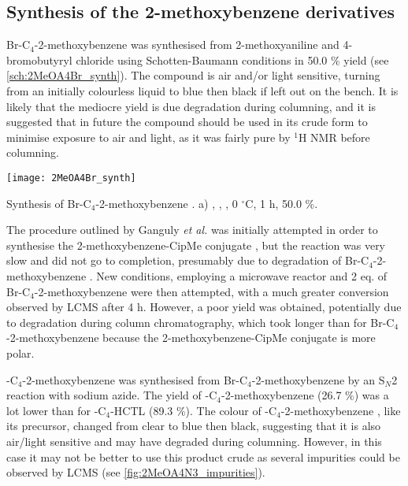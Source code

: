 
\subsection{Synthesis of the 2-methoxybenzene derivatives}

Br-C$_4$-2-methoxybenzene  was synthesised from 2-methoxyaniline  and 4-bromobutyryl chloride  using Schotten-Baumann conditions in 50.0 \% yield (see \ref{sch:2MeOA4Br_synth}). The compound is air and/or light sensitive, turning from an initially colourless liquid to blue then black if left out on the bench. It is likely that the mediocre yield is due degradation during columning, and it is suggested that in future the compound should be used in its crude form to minimise exposure to air and light, as it was fairly pure by $^{1}$H NMR before columning.

\begin{scheme}[H]
	\begin{center}
		\texttt{[image: 2MeOA4Br\_synth]}
		\caption{Synthesis of Br-C$_4$-2-methoxybenzene .
		a) , , , 0 $^{\circ}$C, 1 h, 50.0 \%.
		\label{sch:2MeOA4Br_synth}}
	\end{center}
\end{scheme}

The procedure outlined by Ganguly \textit{et al.}\cite{Ganguly2011} was initially attempted in order to synthesise the 2-methoxybenzene-CipMe conjugate , but the reaction was very slow and did not go to completion, presumably due to degradation of Br-C$_4$-2-methoxybenzene .
New conditions, employing a microwave reactor and 2 eq. of Br-C$_4$-2-methoxybenzene  were then attempted, with a much greater conversion observed by LCMS after 4 h. However, a poor yield was obtained, potentially due to degradation during column chromatography, which took longer than for Br-C$_4$-2-methoxybenzene  because the 2-methoxybenzene-CipMe conjugate  is more polar.

-C$_4$-2-methoxybenzene  was synthesised from Br-C$_4$-2-methoxybenzene  by an S$_N$2 reaction with sodium azide. The yield of -C$_4$-2-methoxybenzene  (26.7 \%) was a lot lower than for -C$_4$-HCTL  (89.3 \%). The colour of -C$_4$-2-methoxybenzene , like its precursor, changed from clear to blue then black, suggesting that it is also air/light sensitive and may have degraded during columning. However, in this case it may not be better to use this product crude as several impurities could be observed by LCMS (see \ref{fig:2MeOA4N3_impurities}).


